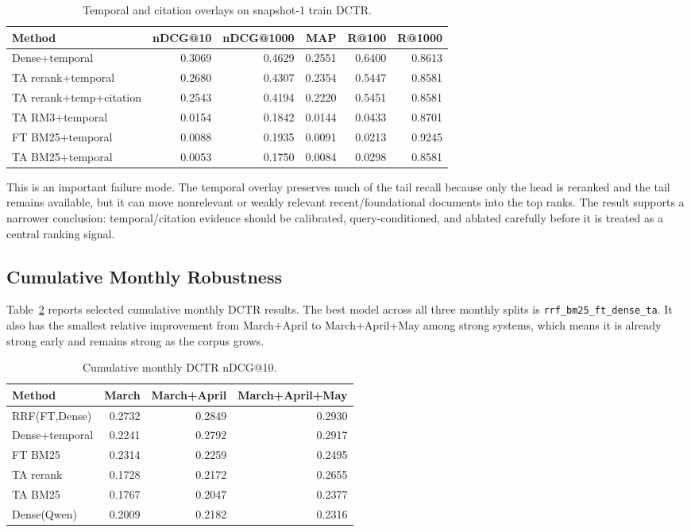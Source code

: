 \documentclass[11pt]{article}
\begin{document}
\begin{table}[ht]
\centering
\caption{Temporal and citation overlays on snapshot-1 train DCTR.}
\label{tab:temporal-results}
\begin{tabular}{lrrrrr}
\toprule
Method & nDCG@10 & nDCG@1000 & MAP & R@100 & R@1000 \\
\midrule
Dense+temporal & 0.3069 & 0.4629 & 0.2551 & 0.6400 & 0.8613 \\
TA rerank+temporal & 0.2680 & 0.4307 & 0.2354 & 0.5447 & 0.8581 \\
TA rerank+temp+citation & 0.2543 & 0.4194 & 0.2220 & 0.5451 & 0.8581 \\
TA RM3+temporal & 0.0154 & 0.1842 & 0.0144 & 0.0433 & 0.8701 \\
FT BM25+temporal & 0.0088 & 0.1935 & 0.0091 & 0.0213 & 0.9245 \\
TA BM25+temporal & 0.0053 & 0.1750 & 0.0084 & 0.0298 & 0.8581 \\
\bottomrule
\end{tabular}
\end{table}

This is an important failure mode. The temporal overlay preserves much of the tail recall because only the head is reranked and the tail remains available, but it can move nonrelevant or weakly relevant recent/foundational documents into the top ranks. The result supports a narrower conclusion: temporal/citation evidence should be calibrated, query-conditioned, and ablated carefully before it is treated as a central ranking signal.

\subsection{Cumulative Monthly Robustness}

Table~\ref{tab:monthly-results} reports selected cumulative monthly DCTR results. The best model across all three monthly splits is \texttt{rrf\_bm25\_ft\_dense\_ta}. It also has the smallest relative improvement from March+April to March+April+May among strong systems, which means it is already strong early and remains strong as the corpus grows.

\begin{table}[ht]
\centering
\caption{Cumulative monthly DCTR nDCG@10.}
\label{tab:monthly-results}
\begin{tabular}{lrrr}
\toprule
Method & March & March+April & March+April+May \\
\midrule
RRF(FT,Dense) & 0.2732 & 0.2849 & 0.2930 \\
Dense+temporal & 0.2241 & 0.2792 & 0.2917 \\
FT BM25 & 0.2314 & 0.2259 & 0.2495 \\
TA rerank & 0.1728 & 0.2172 & 0.2655 \\
TA BM25 & 0.1767 & 0.2047 & 0.2377 \\
Dense(Qwen) & 0.2009 & 0.2182 & 0.2316 \\
\bottomrule
\end{tabular}
\end{table}
\end{document}
